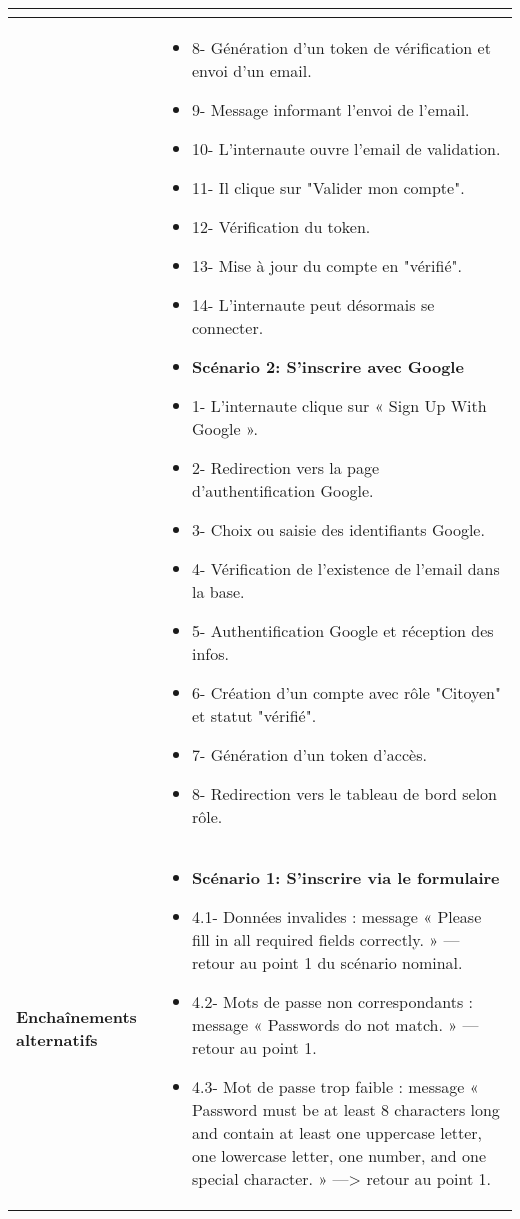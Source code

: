 \begin{longtable}{|>{\arraybackslash}p{4.2cm}|>{\arraybackslash}p{12.5cm}|}
\begin{itemize}[label=]
\end{itemize} \\
\hline
\textbf{}&
\begin{itemize}[label=]
    \item 8- Génération d'un token de vérification et envoi d'un email.
    \item 9- Message informant l'envoi de l'email.
    \item 10- L'internaute ouvre l'email de validation.
    \item 11- Il clique sur "Valider mon compte".
    \item 12- Vérification du token.
    \item 13- Mise à jour du compte en "vérifié".
    \item 14- L'internaute peut désormais se connecter.
    \item \textbf{Scénario 2: S'inscrire avec Google}
    \item 1- L'internaute clique sur « Sign Up With Google ».
    \item 2- Redirection vers la page d'authentification Google.
    \item 3- Choix ou saisie des identifiants Google.
    \item 4- Vérification de l'existence de l'email dans la base.
    \item 5- Authentification Google et réception des infos.
    \item 6- Création d'un compte avec rôle "Citoyen" et statut "vérifié".
    \item 7- Génération d'un token d'accès.
    \item 8- Redirection vers le tableau de bord selon rôle.
\end{itemize}\\
\hline
\textbf{Enchaînements alternatifs} &
\begin{itemize}[label=]
    \item \textbf{Scénario 1: S'inscrire via le formulaire}
    \item 4.1- Données invalides : message « Please fill in all required fields correctly. » — retour au point 1 du scénario nominal.
    \item 4.2- Mots de passe non correspondants : message « Passwords do not match. » — retour au point 1.
    \item 4.3- Mot de passe trop faible : message « Password must be at least 8 characters long and contain at least one uppercase letter, one lowercase letter, one number, and one special character. » —> retour au point 1.


\end{itemize}
\end{longtable}
